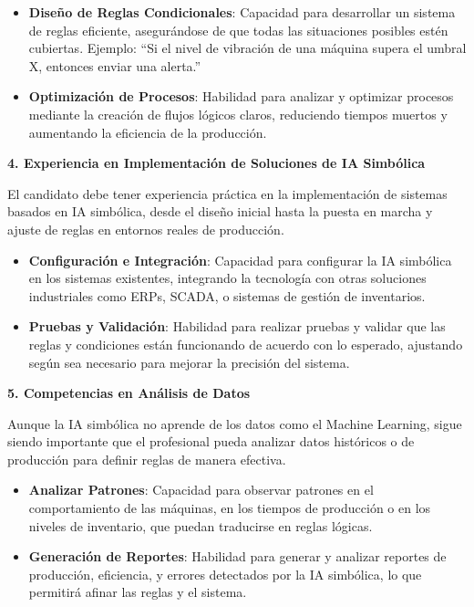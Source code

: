 \documentclass[
  10pt,
  letterpaper,
]{book}
\providecommand{\tightlist}{%
  \setlength{\itemsep}{0pt}\setlength{\parskip}{0pt}}\usepackage{longtable,booktabs,array}
\begin{document}
\begin{itemize}
\tightlist
\item
  \textbf{Diseño de Reglas Condicionales}: Capacidad para desarrollar un
  sistema de reglas eficiente, asegurándose de que todas las situaciones
  posibles estén cubiertas. Ejemplo: ``Si el nivel de vibración de una
  máquina supera el umbral X, entonces enviar una alerta.''
\item
  \textbf{Optimización de Procesos}: Habilidad para analizar y optimizar
  procesos mediante la creación de flujos lógicos claros, reduciendo
  tiempos muertos y aumentando la eficiencia de la producción.
\end{itemize}

\textbf{4. Experiencia en Implementación de Soluciones de IA Simbólica}

El candidato debe tener experiencia práctica en la implementación de
sistemas basados en IA simbólica, desde el diseño inicial hasta la
puesta en marcha y ajuste de reglas en entornos reales de producción.

\begin{itemize}
\tightlist
\item
  \textbf{Configuración e Integración}: Capacidad para configurar la IA
  simbólica en los sistemas existentes, integrando la tecnología con
  otras soluciones industriales como ERPs, SCADA, o sistemas de gestión
  de inventarios.
\item
  \textbf{Pruebas y Validación}: Habilidad para realizar pruebas y
  validar que las reglas y condiciones están funcionando de acuerdo con
  lo esperado, ajustando según sea necesario para mejorar la precisión
  del sistema.
\end{itemize}

\textbf{5. Competencias en Análisis de Datos}

Aunque la IA simbólica no aprende de los datos como el Machine Learning,
sigue siendo importante que el profesional pueda analizar datos
históricos o de producción para definir reglas de manera efectiva.

\begin{itemize}
\tightlist
\item
  \textbf{Analizar Patrones}: Capacidad para observar patrones en el
  comportamiento de las máquinas, en los tiempos de producción o en los
  niveles de inventario, que puedan traducirse en reglas lógicas.
\item
  \textbf{Generación de Reportes}: Habilidad para generar y analizar
  reportes de producción, eficiencia, y errores detectados por la IA
  simbólica, lo que permitirá afinar las reglas y el sistema.
\end{itemize}
\end{document}

